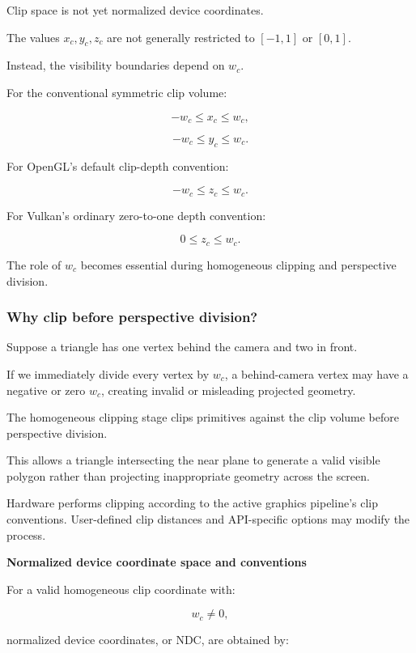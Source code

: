 Clip space is not yet normalized device coordinates.

The values \(x_c,y_c,z_c\) are not generally restricted to \([-1,1]\) or \([0,1]\).

Instead, the visibility boundaries depend on \(w_c\).

For the conventional symmetric clip volume:

\[
 -w_c\le x_c\le w_c,
\]

\[
 -w_c\le y_c\le w_c.
\]

For OpenGL's default clip-depth convention:

\[
 -w_c\le z_c\le w_c.
\]

For Vulkan's ordinary zero-to-one depth convention:

\[
 0\le z_c\le w_c.
\]

The role of \(w_c\) becomes essential during homogeneous clipping and perspective division.

\subsubsection{Why clip before perspective division?}\label{02-foundations-ii-ch032-why-clip-before-perspective-division}

\hypertarget{02-foundations-ii-ch032-why-clip-before-perspective-division}{}

Suppose a triangle has one vertex behind the camera and two in front.

If we immediately divide every vertex by \(w_c\), a behind-camera vertex may have a negative or zero \(w_c\), creating invalid or misleading projected geometry.

The homogeneous clipping stage clips primitives against the clip volume before perspective division.

This allows a triangle intersecting the near plane to generate a valid visible polygon rather than projecting inappropriate geometry across the screen.

Hardware performs clipping according to the active graphics pipeline's clip conventions. User-defined clip distances and API-specific options may modify the process.

\textbf{Normalized device coordinate space and conventions}

For a valid homogeneous clip coordinate with:

\[
 w_c\ne0,
\]

normalized device coordinates, or NDC, are obtained by:

